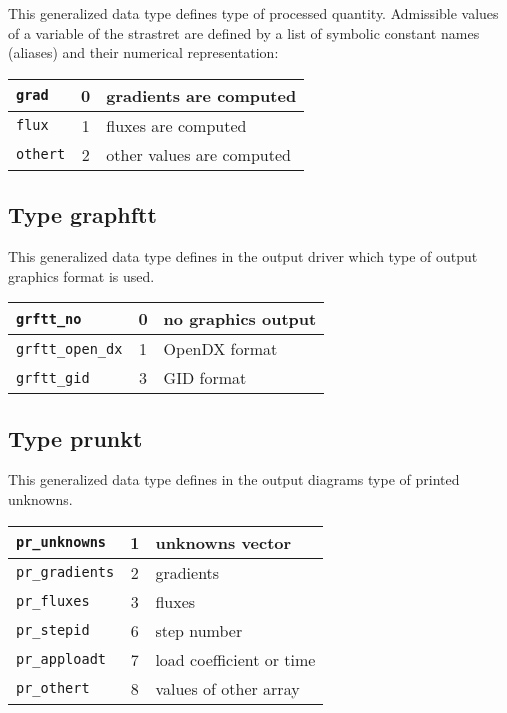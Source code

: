 This generalized data type defines type of processed quantity.
Admissible values of a variable of the {\sf strastret} are defined by a list of symbolic constant names (aliases)
and their numerical representation:

\begin{center}
\begin{tabular}{|l|c|l|}
\hline
{\tt grad} & 0 & gradients are computed
\\ \hline
{\tt flux} & 1 & fluxes are computed
\\ \hline
{\tt othert} & 2 & other values are computed
\\ \hline
\end{tabular}
\end{center}


\subsection{Type {\sf graphftt}}
\label{sectgraphftt}
This generalized data type defines in the output driver which type of
output graphics format is used.

\begin{center}
\begin{tabular}{|l|c|l|}
\hline
{\tt grftt\_no} & 0 & no graphics output
\\ \hline
{\tt grftt\_open\_dx} & 1 & OpenDX format
\\ \hline
{\tt grftt\_gid} & 3 & GID format
\\ \hline
\end{tabular}
\end{center}

\subsection{Type {\sf prunkt}}
\label{sectprunkt}
This generalized data type defines in the output diagrams type of
printed unknowns. 

\begin{center}
\begin{tabular}{|l|c|l|}
\hline
{\tt pr\_unknowns} & 1 & unknowns vector
\\ \hline
{\tt pr\_gradients} & 2 & gradients
\\ \hline
{\tt pr\_fluxes} & 3 & fluxes
\\ \hline
{\tt pr\_stepid} & 6 & step number
\\ \hline
{\tt pr\_apploadt} & 7 & load coefficient or time
\\ \hline
{\tt pr\_othert} & 8 & values of other array
\\ \hline
\end{tabular}
\end{center}


